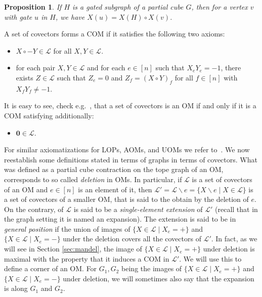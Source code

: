 \documentclass[final,11pt]{article}
\newtheorem{prop}[thm]{Proposition}%
\newcommand{\covectors}{\ensuremath{\mathcal{L}}}
\begin{document}
\begin{prop}{\cite{Kna-17}}\label{prop:gates}                                 If $H$ is a gated subgraph of a partial cube $G$, then for a vertex $v$ with gate $u$ in $H$, we have $X(u)=X(H)\circ X(v)$.
\end{prop}

A set of covectors forms a COM if it satisfies the following two axioms:

\begin{itemize}
\item[{ (FS)}] $X\circ -Y \in  \covectors$  for all $X,Y \in  \covectors$.
\item[{ (SE)}]  for each pair $X,Y\in\covectors$ and for each $e\in [n]$ such that $X_eY_e=-1$,  there exists $Z \in  \covectors$ such that
$Z_e=0$  and  $Z_f=(X\circ Y)_f$  for all $f\in [n]$ with $X_fY_f\ne -1$.
\end{itemize}

It is easy to see, check e.g.~\cite{Ban-18}, that a set of covectors is an OM if and only if it is a COM satisfying additionally:


\begin{itemize}
\item[{ (Z)}] $\mathbf{0} \in  \covectors$.
\end{itemize}


For similar axiomatizations for LOPs, AOMs, and UOMs we refer to~\cite{Ban-18,Bau-16}. We now reestablish some definitions stated in terms of graphs in terms of covectors. What was defined as a partial cube contraction on the tope graph of an OM, corresponds to so called \emph{deletion} in OMs. In particular, if $\covectors$ is a set of covectors of an OM and $e\in[n]$ is an element of it, then $\covectors' = \covectors \backslash e = \{X \backslash e \mid X \in \covectors \}$ is a set of covectors of a smaller OM, that is said to the obtain by the deletion of $e$. On the contrary, of $\covectors$ is said to be a \emph{single-element extension} of $\covectors'$ (recall that in the graph setting it is named an expansion). The extension is said to be in \emph{general position} if the union of images of $\{X \in \covectors \mid X_e=+\}$ and $\{X \in \covectors \mid X_e=-\}$ under the deletion covers all the covectors of $\covectors'$. In fact, as we will see in Section \ref{sec:mandel}, the image of $\{X \in \covectors \mid X_e=+\}$ under deletion is maximal with the property that it induces a COM in $\covectors'$. We will use this to define a corner of an OM. For $G_1,G_2$ being the images of $\{X \in \covectors \mid X_e=+\}$ and $\{X \in \covectors \mid X_e=-\}$ under deletion, we will sometimes also say that the expansion is along $G_1$ and $G_2$.
\end{document}
